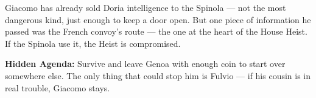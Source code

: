 \begin{secretbox}
Giacomo has already sold Doria intelligence to the Spinola --- not the most
dangerous kind, just enough to keep a door open. But one piece of information
he passed was the French convoy's route --- the one at the heart of the
House Heist. If the Spinola use it, the Heist is compromised.

\medskip
\textbf{\textcolor{SecretRed}{Hidden Agenda:}} Survive and leave Genoa with enough
coin to start over somewhere else. The only thing that could stop him is Fulvio
--- if his cousin is in real trouble, Giacomo stays.
\end{secretbox}










